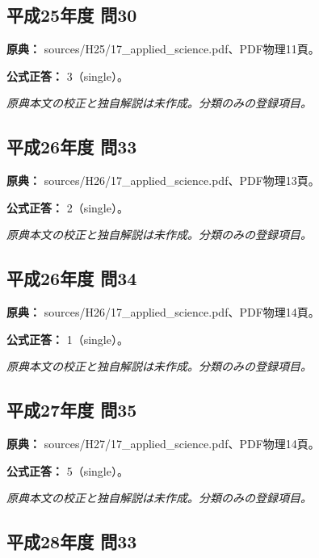 \subsection{平成25年度 問30}
\label{q:h25-reg-applied-30}

\noindent\textbf{原典：} sources/H25/17\_applied\_science.pdf、PDF物理11頁。

\textbf{公式正答：} 3（single）。

\par\textit{原典本文の校正と独自解説は未作成。分類のみの登録項目。}

\subsection{平成26年度 問33}
\label{q:h26-reg-applied-33}

\noindent\textbf{原典：} sources/H26/17\_applied\_science.pdf、PDF物理13頁。

\textbf{公式正答：} 2（single）。

\par\textit{原典本文の校正と独自解説は未作成。分類のみの登録項目。}

\subsection{平成26年度 問34}
\label{q:h26-reg-applied-34}

\noindent\textbf{原典：} sources/H26/17\_applied\_science.pdf、PDF物理14頁。

\textbf{公式正答：} 1（single）。

\par\textit{原典本文の校正と独自解説は未作成。分類のみの登録項目。}

\subsection{平成27年度 問35}
\label{q:h27-reg-applied-35}

\noindent\textbf{原典：} sources/H27/17\_applied\_science.pdf、PDF物理14頁。

\textbf{公式正答：} 5（single）。

\par\textit{原典本文の校正と独自解説は未作成。分類のみの登録項目。}

\subsection{平成28年度 問33}
\label{q:h28-reg-applied-33}

